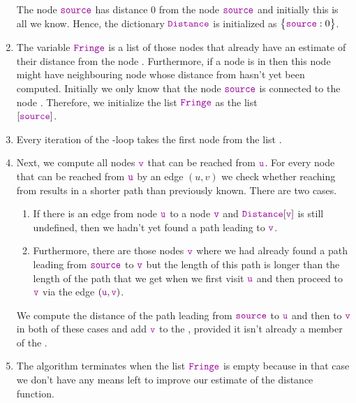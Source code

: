 \begin{enumerate}
      The node $\mytt{source}$ has distance $0$ from the node $\mytt{source}$ and initially this is
      all we know.  Hence, the dictionary $\mytt{Distance}$ is initialized as $\bigl\{\mytt{source}:0 \bigr\}$.
\item The variable $\mytt{Fringe}$ is a list of those nodes that already have an estimate of
      their distance from the  node .  Furthermore, if a node is in  then this
      node might have neighbouring node whose distance from  hasn't yet been computed. 
      Initially we only know that the node $\mytt{source}$ is connected to the node .
      Therefore, we initialize the list $\mytt{Fringe}$ as the list
      \\[-0.2cm]
      \hspace*{1.3cm}
      $[ \mytt{source} ]$.
\item Every iteration of the -loop takes the first node  from the list .
\item Next, we compute all nodes $\mytt{v}$ that can be reached from $\mytt{u}$. For every node 
      that can be reached from $\mytt{u}$ by an edge $(u, v)$ we check whether 
      reaching  from  results in a shorter path than previously known.
      There are two cases.
      \begin{enumerate}
      \item If there is an edge from node $\mytt{u}$ to a node $\mytt{v}$ and  $\mytt{Distance}[\mytt{v}]$ is still
            undefined, then we hadn't yet found a path leading to $\mytt{v}$.
      \item Furthermore, there are those nodes $\mytt{v}$ where we had already found a path leading from
            $\mytt{source}$ to $\mytt{v}$ but the length of this path is longer than the length of the path
            that we get when we first visit $\mytt{u}$ and then proceed to $\mytt{v}$ via the edge $(\mytt{u},\mytt{v})$.
      \end{enumerate}
      We compute the distance of the path leading from $\mytt{source}$ to $\mytt{u}$ and then to
      $\mytt{v}$ in both of these cases and add $\mytt{v}$ to the , provided it isn't
      already a member of the .
\item The algorithm terminates when the list $\mytt{Fringe}$ is empty because in that case we don't
      have any means left to improve our estimate of the distance function.
\end{enumerate}

